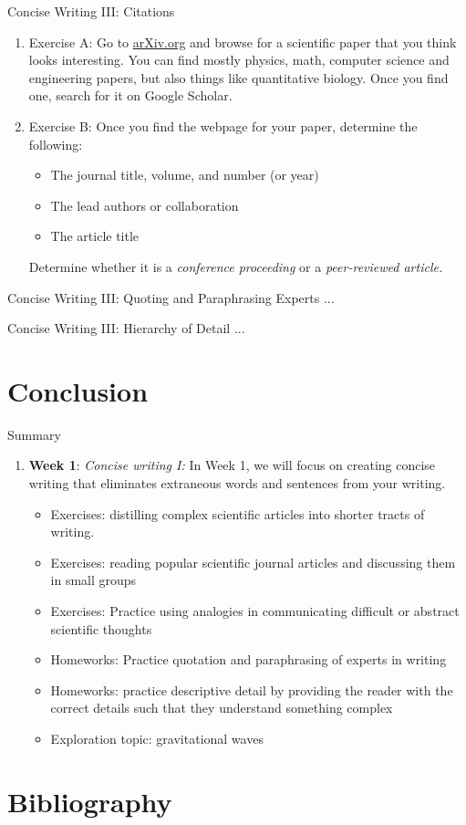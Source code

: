 \documentclass{beamer}
\begin{document}
\begin{frame}{Concise Writing III: Citations}
\begin{enumerate}
\item Exercise A: Go to \url{arXiv.org} and browse for a scientific paper that you think looks interesting.  You can find mostly physics, math, computer science and engineering papers, but also things like quantitative biology.  Once you find one, search for it on Google Scholar.
\item Exercise B: Once you find the webpage for your paper, determine the following: 
\begin{itemize}
\item The journal title, volume, and number (or year)
\item The lead authors or collaboration
\item The article title
\end{itemize}
Determine whether it is a \textit{conference proceeding} or a \textit{peer-reviewed article.}
\end{enumerate}
\end{frame}

\begin{frame}{Concise Writing III: Quoting and Paraphrasing Experts}
...
\end{frame}

\begin{frame}{Concise Writing III: Hierarchy of Detail}
...
\end{frame}

\section{Conclusion}

\begin{frame}{Summary}
\begin{enumerate}
\item \textbf{Week 1}: \textit{Concise writing I:} In Week 1, we will focus on creating concise writing that eliminates extraneous words and sentences from your writing.
\begin{itemize}
\item Exercises: distilling complex scientific articles into shorter tracts of writing.
\item Exercises: reading popular scientific journal articles and discussing them in small groups
\item Exercises: Practice using analogies in communicating difficult or abstract scientific thoughts
\item Homeworks: Practice quotation and paraphrasing of experts in writing
\item Homeworks: practice descriptive detail by providing the reader with the correct details such that they understand something complex
\item Exploration topic: gravitational waves
\end{itemize}
\end{enumerate}
\end{frame}


\section{Bibliography}


\end{document}
